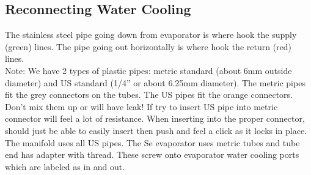 \subsection{Reconnecting Water Cooling}
The stainless steel pipe going down from evaporator is where hook the supply (green) lines. The pipe going out horizontally is where hook the return (red) lines.\\
Note: We have 2 types of plastic pipes: metric standard (about 6mm outside diameter) and US standard (1/4” or about 6.25mm diameter). The metric pipes fit the grey connectors on the tubes. The US pipes fit the orange connectors. Don’t mix them up or will have leak! If try to insert US pipe into metric connector will feel a lot of resistance. When inserting into the proper connector, should just be able to easily insert then push and feel a click as it locks in place.
The manifold uses all US pipes. The Se evaporator uses metric tubes and tube end has adapter with thread. These screw onto evaporator water cooling ports which are labeled as in and out.


